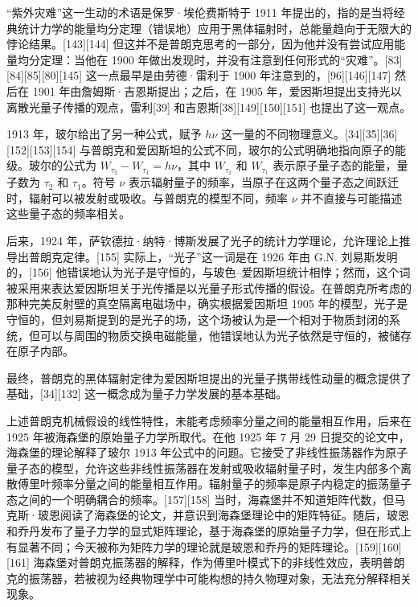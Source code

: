 “紫外灾难”这一生动的术语是保罗·埃伦费斯特于 1911 年提出的，指的是当将经典统计力学的能量均分定理（错误地）应用于黑体辐射时，总能量趋向于无限大的悖论结果。[143][144] 但这并不是普朗克思考的一部分，因为他并没有尝试应用能量均分定理：当他在 1900 年做出发现时，并没有注意到任何形式的“灾难”。[83][84][85][80][145] 这一点最早是由劳德·雷利于 1900 年注意到的，[96][146][147] 然后在 1901 年由詹姆斯·吉恩斯提出；之后，在 1905 年，爱因斯坦提出支持光以离散光量子传播的观点，雷利[39] 和吉恩斯[38][149][150][151] 也提出了这一观点。

1913 年，玻尔给出了另一种公式，赋予 \( h\nu \) 这一量的不同物理意义。[34][35][36][152][153][154] 与普朗克和爱因斯坦的公式不同，玻尔的公式明确地指向原子的能级。玻尔的公式为 \( W_{\tau_2} - W_{\tau_1} = h\nu \)，其中 \( W_{\tau_2} \) 和 \( W_{\tau_1} \) 表示原子量子态的能量，量子数为 \( \tau_2 \) 和 \( \tau_1 \)。符号 \( \nu \) 表示辐射量子的频率，当原子在这两个量子态之间跃迁时，辐射可以被发射或吸收。与普朗克的模型不同，频率 \( \nu \) 并不直接与可能描述这些量子态的频率相关。

后来，1924 年，萨钦德拉·纳特·博斯发展了光子的统计力学理论，允许理论上推导出普朗克定律。[155] 实际上，“光子”这一词是在 1926 年由 G.N. 刘易斯发明的，[156] 他错误地认为光子是守恒的，与玻色–爱因斯坦统计相悖；然而，这个词被采用来表达爱因斯坦关于光传播是以光量子形式传播的假设。在普朗克所考虑的那种完美反射壁的真空隔离电磁场中，确实根据爱因斯坦 1905 年的模型，光子是守恒的，但刘易斯提到的是光子的场，这个场被认为是一个相对于物质封闭的系统，但可以与周围的物质交换电磁能量，他错误地认为光子依然是守恒的，被储存在原子内部。

最终，普朗克的黑体辐射定律为爱因斯坦提出的光量子携带线性动量的概念提供了基础，[34][132] 这一概念成为量子力学发展的基本基础。

上述普朗克机械假设的线性特性，未能考虑频率分量之间的能量相互作用，后来在 1925 年被海森堡的原始量子力学所取代。在他 1925 年 7 月 29 日提交的论文中，海森堡的理论解释了玻尔 1913 年公式中的问题。它接受了非线性振荡器作为原子量子态的模型，允许这些非线性振荡器在发射或吸收辐射量子时，发生内部多个离散傅里叶频率分量之间的能量相互作用。辐射量子的频率是原子内稳定的振荡量子态之间的一个明确耦合的频率。[157][158] 当时，海森堡并不知道矩阵代数，但马克斯·玻恩阅读了海森堡的论文，并意识到海森堡理论中的矩阵特征。随后，玻恩和乔丹发布了量子力学的显式矩阵理论，基于海森堡的原始量子力学，但在形式上有显著不同；今天被称为矩阵力学的理论就是玻恩和乔丹的矩阵理论。[159][160][161] 海森堡对普朗克振荡器的解释，作为傅里叶模式下的非线性效应，表明普朗克的振荡器，若被视为经典物理学中可能构想的持久物理对象，无法充分解释相关现象。

